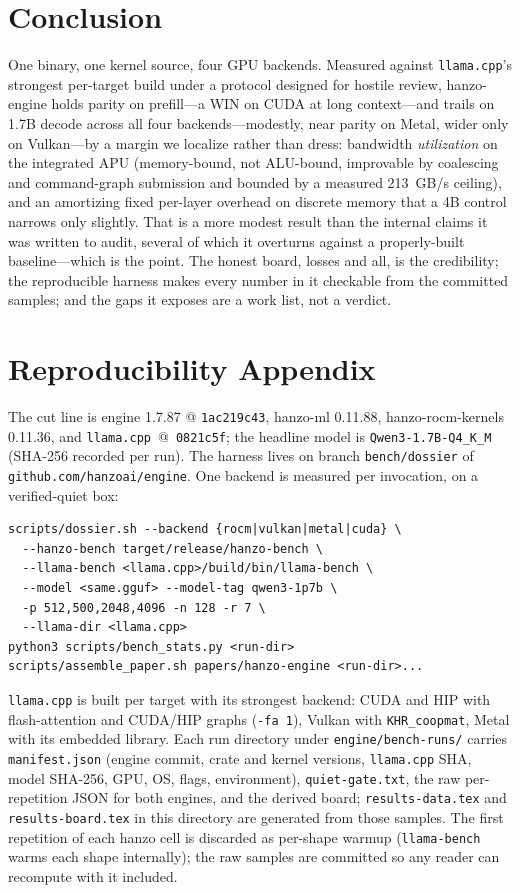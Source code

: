 \documentclass[11pt]{article}
\begin{document}
\section{Conclusion}
One binary, one kernel source, four GPU backends. Measured against \texttt{llama.cpp}'s
strongest per-target build under a protocol designed for hostile review, hanzo-engine holds
parity on prefill---a WIN on CUDA at long context---and trails on 1.7B decode across all
four backends---modestly, near parity on Metal, wider only on Vulkan---by a margin we localize
rather than dress: bandwidth \emph{utilization} on the
integrated APU (memory-bound, not ALU-bound, improvable by coalescing and command-graph
submission and bounded by a measured 213~GB/s ceiling), and an amortizing fixed per-layer
overhead on discrete memory that a 4B control narrows only slightly. That is a more modest result
than the internal claims it was written to audit, several of which it overturns against a
properly-built baseline---which is the point. The honest board, losses and all, is the
credibility; the reproducible harness makes every number in it checkable from the committed
samples; and the gaps it exposes are a work list, not a verdict.

\appendix
\section{Reproducibility Appendix}\label{sec:appendix}
The cut line is engine 1.7.87 @ \texttt{1ac219c43}, hanzo-ml 0.11.88,
hanzo-rocm-kernels 0.11.36, and \texttt{llama.cpp}~@~\texttt{0821c5f}; the headline
model is \texttt{Qwen3-1.7B-Q4\_K\_M} (SHA-256 recorded per run). The harness lives on
branch \texttt{bench/dossier} of \texttt{github.com/hanzoai/engine}. One backend is
measured per invocation, on a verified-quiet box:
{\footnotesize
\begin{verbatim}
scripts/dossier.sh --backend {rocm|vulkan|metal|cuda} \
  --hanzo-bench target/release/hanzo-bench \
  --llama-bench <llama.cpp>/build/bin/llama-bench \
  --model <same.gguf> --model-tag qwen3-1p7b \
  -p 512,500,2048,4096 -n 128 -r 7 \
  --llama-dir <llama.cpp>
python3 scripts/bench_stats.py <run-dir>
scripts/assemble_paper.sh papers/hanzo-engine <run-dir>...
\end{verbatim}}
\noindent
\texttt{llama.cpp} is built per target with its strongest backend: CUDA and HIP with
flash-attention and CUDA/HIP graphs (\texttt{-fa 1}), Vulkan with \texttt{KHR\_coopmat},
Metal with its embedded library. Each run directory under \texttt{engine/bench-runs/}
carries \texttt{manifest.json} (engine commit, crate and kernel versions,
\texttt{llama.cpp} SHA, model SHA-256, GPU, OS, flags, environment),
\texttt{quiet-gate.txt}, the raw per-repetition JSON for both engines, and the derived
board; \texttt{results-data.tex} and \texttt{results-board.tex} in this directory are
generated from those samples. The first repetition of each hanzo cell is discarded as
per-shape warmup (\texttt{llama-bench} warms each shape internally); the raw samples are
committed so any reader can recompute with it included.



\end{document}
